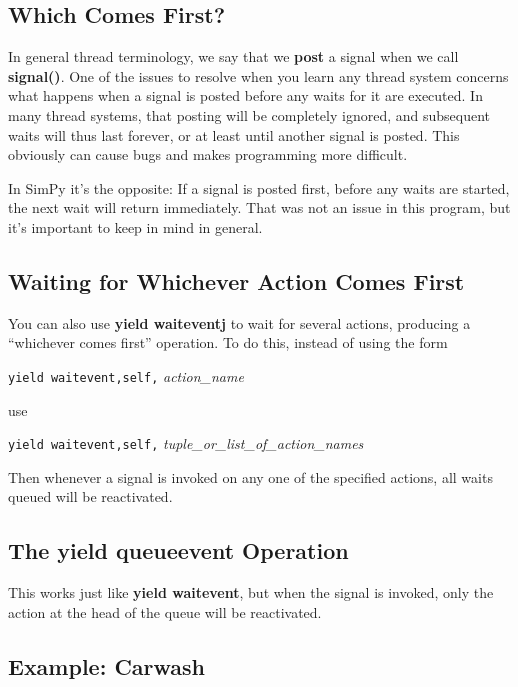 \documentclass[11pt]{article}
\begin{document}
\subsection{Which Comes First?}

In general thread terminology, we say that we {\bf post} a signal when
we call {\bf signal()}.  One of the issues to resolve when you learn any
thread system concerns what happens when a signal is posted before any
waits for it are executed.  In many thread systems, that posting will be
completely ignored, and subsequent waits will thus last forever, or at
least until another signal is posted.  This obviously can cause bugs and
makes programming more difficult.

In SimPy it's the opposite:  If a signal is posted first, before any
waits are started, the next wait will return immediately.  That was
not an issue in this program, but it's important to keep in mind in
general.

\subsection{Waiting for Whichever Action Comes First}

You can also use {\bf yield waiteventj} to wait for several actions,
producing a ``whichever comes first'' operation.  To do this, instead of
using the form

{\tt yield waitevent,self,} {\it action\_name}

use

{\tt yield waitevent,self,} {\it tuple\_or\_list\_of\_action\_names}

Then whenever a signal is invoked on any one of the specified actions,
all waits queued will be reactivated.

\subsection{The yield queueevent Operation}

This works just like {\bf yield waitevent}, but when the signal is
invoked, only the action at the head of the queue will be reactivated.

\subsection{Example:  Carwash}
\end{document}
